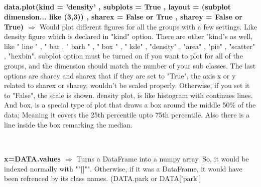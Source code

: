 \documentclass[a4paper,18pt]{article}
\begin{document}

\subsection{\colorbox {matgreen}{\color{white}{\large data.plot(Options)}}}
\textbf{data.plot(kind = 'density' , subplots = True , layout = (subplot dimension... like (3,3)) , sharex = False or True , sharey = False or True) $\Rightarrow$} Would plot different figures for all the groups with a few settings. Like density figure which is declared in "kind" option. There are other "kind"s as well, like " line " , " bar  , " barh " , " box " , " kde" , "density" , "area" , "pie" , "scatter" , "hexbin". subplot option must be turned on if you want to plot for all of the groups, and the dimension should match the number of your sub classes. The last options are sharey and sharex that if they are set to "True", the axis x or y related to sharex or sharey, wouldn't be scaled properly. Otherwise, if you set it to "False", the scale is shown. 
density plot, is like histogram with continues lines. And box, is a special type of plot that draws a box around the middle 50\% of the data; Meaning it covers the 25th percentile upto 75th percentile. Also there is a line inside the box remarking the median.\\\\


\subsection{\colorbox {matgreen}{\color{white}{\large DATA.values}}}
\textbf{x=DATA.values $\Rightarrow$} Turns a DataFrame into a numpy array. So, it would be indexed normally with ""[]"". Otherwise, if it was a DataFrame, it would have been refrenced by its class names. (DATA.park or DATA['park'] \\\\


\newpage

\end{document}
